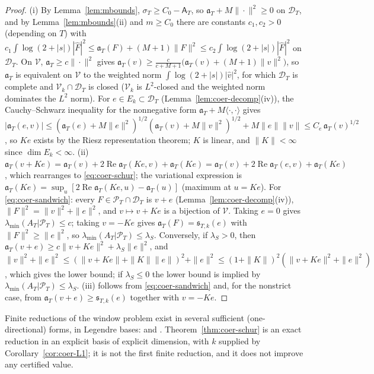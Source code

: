 \documentclass[11pt]{amsart}
\theoremstyle{definition}
\theoremstyle{remark}
\newcommand{\Rel}{\operatorname{Re}}
\newcommand{\PT}{\mathcal P_T}
\newcommand{\lamA}{\lambda_{\min}(A_T|\PT)}
\newcommand{\Fh}{\widehat F}
\newcommand{\Aconst}{\mathsf A_T}
\begin{document}
\begin{proof}
(i) By Lemma~\ref{lem:mbounds}, $\sigma_T\ge C_0-\Aconst$, so $\mathfrak a_T+M\|\cdot\|^2\ge0$ on $\mathcal D_T$, and
by Lemma~\ref{lem:mbounds}(ii) and $m\ge C_0$ there are constants $c_1,c_2>0$ (depending on $T$) with
$c_1\int\log(2+|s|)|\Fh|^2\le\mathfrak a_T(F)+(M+1)\|F\|^2\le c_2\int\log(2+|s|)|\Fh|^2$ on $\mathcal D_T$. On $\mathcal V$,
$\mathfrak a_T\ge c\|\cdot\|^2$ gives $\mathfrak a_T(v)\ge\frac c{c+M+1}\big(\mathfrak a_T(v)+(M+1)\|v\|^2\big)$, so
$\mathfrak a_T$ is equivalent on $\mathcal V$ to the weighted norm $\int\log(2+|s|)|\widehat v|^2$, for which
$\mathcal D_T$ is complete and $\mathcal V_k\cap\mathcal D_T$ is closed ($\mathcal V_k$ is $L^2$-closed and the weighted norm
dominates the $L^2$ norm). For $e\in E_k\subset\mathcal D_T$ (Lemma~\ref{lem:coer-decomp}(iv)), the Cauchy--Schwarz
inequality for the nonnegative form $\mathfrak a_T+M\langle\cdot,\cdot\rangle$ gives
$|\mathfrak a_T(e,v)|\le(\mathfrak a_T(e)+M\|e\|^2)^{1/2}(\mathfrak a_T(v)+M\|v\|^2)^{1/2}+M\|e\|\|v\|\le C_e\,\mathfrak a_T(v)^{1/2}$,
so $Ke$ exists by the Riesz representation theorem; $K$ is linear, and $\|K\|<\infty$ since $\dim E_k<\infty$.
(ii) $\mathfrak a_T(v+Ke)=\mathfrak a_T(v)+2\Rel\mathfrak a_T(Ke,v)+\mathfrak a_T(Ke)=\mathfrak a_T(v)+2\Rel\mathfrak a_T(e,v)+\mathfrak a_T(Ke)$,
which rearranges to \eqref{eq:coer-schur}; the variational expression is $\mathfrak a_T(Ke)=\sup_u[2\Rel\mathfrak a_T(Ke,u)-\mathfrak a_T(u)]$
(maximum at $u=Ke$). For \eqref{eq:coer-sandwich}: every $F\in\PT\cap\mathcal D_T$ is $v+e$ (Lemma~\ref{lem:coer-decomp}(iv)),
$\|F\|^2=\|v\|^2+\|e\|^2$, and $v\mapsto v+Ke$ is a bijection of $\mathcal V$. Taking $e=0$ gives $\lamA\le c$; taking
$v=-Ke$ gives $\mathfrak a_T(F)=\mathfrak s_{T,k}(e)$ with $\|F\|^2\ge\|e\|^2$, so $\lamA\le\lambda_S$. Conversely, if
$\lambda_S>0$, then $\mathfrak a_T(v+e)\ge c\|v+Ke\|^2+\lambda_S\|e\|^2$, and
$\|v\|^2+\|e\|^2\le(\|v+Ke\|+\|K\|\|e\|)^2+\|e\|^2\le(1+\|K\|)^2(\|v+Ke\|^2+\|e\|^2)$, which gives the lower bound; if
$\lambda_S\le0$ the lower bound is implied by $\lamA\le\lambda_S$. (iii) follows from \eqref{eq:coer-sandwich}
and, for the nonstrict case, from $\mathfrak a_T(v+e)\ge\mathfrak s_{T,k}(e)$ together with $v=-Ke$.
\end{proof}

Finite reductions of the window problem exist in several sufficient (one-directional) forms, in Legendre
bases: \cite[Thms.~1.1, 1.4]{Zhu2026} and \cite{Groskin2026}. Theorem~\ref{thm:coer-schur} is an exact reduction
in an explicit basis of explicit dimension, with $k$ supplied by Corollary~\ref{cor:coer-L1}; it is not the first
finite reduction, and it does not improve any certified value.
\end{document}
